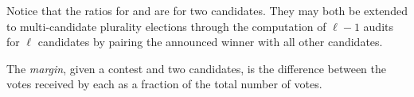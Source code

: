 Notice that the ratios for \BRAVO and \Minerva are for two candidates. They may both be extended to multi-candidate plurality elections through the computation of $\ell -1$ audits for $\ell$ candidates by pairing the announced winner with all other candidates. 

The {\em margin}, given a contest and two candidates, is the difference between the votes received by each as a fraction of the total number of votes. 

\begin{comment}
\begin{definition}[$ (\alpha, p, \bm{n_j} ) $-\Minerva]
     \label{def:minerva}
     Given \B $(\alpha, p)$-\BRAVO and cumulative round sizes\\ $\bm{n_j}$, the corresponding \R \Minerva stopping rule for the $j^{th}$ round is:
 \begin{equation}
     \mathcal{A}(X_{j})=  \left\{ \begin{array}{ll} \text{Correct} ~~~~ \tau_{j}(k_{j}, p_a, \frac{1}{2}, \bm{n_j}, \alpha ) \geq \frac{1}{\alpha}\\
             Undetermined ~~else \\
         \end{array}
         \right .
         \label{eqn:minerva-test}
 \end{equation}
\end{definition}
\end{comment}



